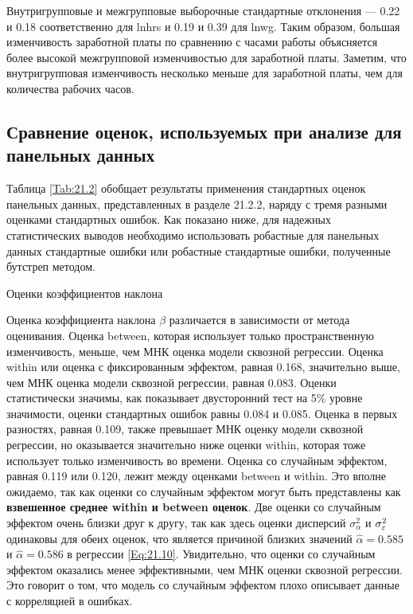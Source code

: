 Внутригрупповые и межгрупповые выборочные стандартные отклонения --- 0.22 и 0.18 соответственно для lnhrs и 0.19 и 0.39 для lnwg. Таким образом, большая изменчивость заработной платы по сравнению с часами работы объясняется более высокой межгрупповой изменчивостью для заработной платы. Заметим, что внутригрупповая изменчивость несколько меньше для заработной платы, чем для количества рабочих часов.

\subsection{Сравнение оценок, используемых при анализе для панельных данных}
Таблица \ref{Tab:21.2} обобщает результаты применения стандартных оценок панельных данных, представленных в разделе 21.2.2, наряду с тремя разными оценками стандартных ошибок. Как показано ниже, для надежных статистических выводов необходимо использовать робастные для панельных данных стандартные ошибки  или робастные стандартные ошибки, полученные бутстреп методом.

{\centering
Оценки коэффициентов наклона\\}

Оценка коэффициента наклона $\beta$ различается в зависимости от метода оценивания.  Оценка between, которая использует только пространственную изменчивость, меньше, чем МНК оценка модели сквозной регрессии. Оценка within или оценка с фиксированным эффектом, равная 0.168, значительно выше, чем МНК оценка модели сквозной регрессии, равная 0.083. Оценки статистически значимы, как показывает двусторонний тест на 5\% уровне значимости, оценки стандартных ошибок равны 0.084 и 0.085. %
Оценка в первых разностях, равная 0.109, также превышает МНК оценку модели сквозной регрессии, но оказывается значительно ниже оценки within, которая тоже использует только изменчивость во времени. Оценка со случайным эффектом, равная 0.119 или 0.120, лежит между оценками between и within. Это вполне ожидаемо, так как оценки со случайным эффектом могут быть представлены как \textbf{взвешенное среднее within и between оценок}. Две оценки со случайным эффектом очень близки друг к другу, так как здесь оценки дисперсий $\sigma^2_{\alpha}$ и $\sigma^2_{\varepsilon}$ одинаковы для обеих оценок, что является причиной близких значений $\hat{\alpha}=0.585$ и $\hat{\alpha}=0.586$ в регрессии \ref{Eq:21.10}. Увидительно, что оценки со случайным эффектом оказались менее эффективными, чем МНК оценки сквозной регрессии. Это говорит о том, что модель со случайным эффектом плохо описывает данные с корреляцией в ошибках. 

